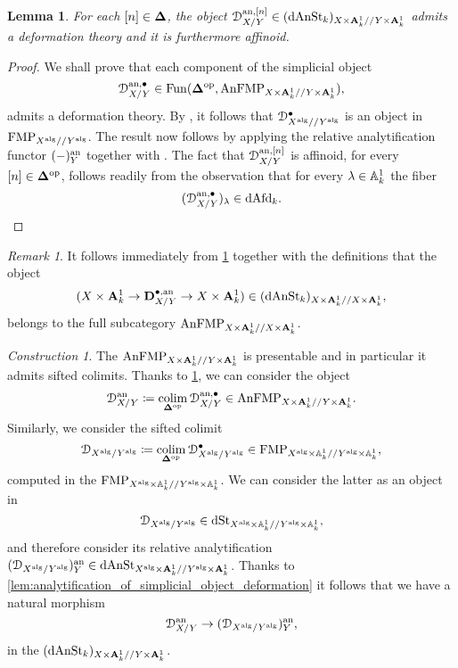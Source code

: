 \documentclass[10pt,a4paper,reqno]{amsart} %
\theoremstyle{plain}
\newtheorem{lem}[thm]{Lemma}
\theoremstyle{definition}
\theoremstyle{remark}
\newtheorem{rem}[thm]{Remark}
\numberwithin{equation}{section}
\newtheorem{construction}[thm]{Construction}
\begin{document}
\begin{lem} \label{lem:deformation_theory_for_D^an_bullet_X/Y}
    For each $[n] \in \bm{\Delta}$, the object $\mathcal D_{X/Y}^{\mathrm{an}, [n]} \in (\mathrm{dAnSt}_k)_{X \times \mathbf A^1_k/ /Y \times \mathbf A^1_k}$ admits a deformation theory and it is furthermore affinoid.
\end{lem}

\begin{proof}
    We shall prove that each component of the simplicial object
        \[\mathcal D^{ \mathrm{an}, \bullet}_{X/ Y} \in \operatorname{Fun}(\bm{\Delta} ^\mathrm{op}, \mathrm{AnFMP}_{X \times \mathbf A^1_k/ /Y\times\mathbf A^1_k}),\]
    admits a deformation theory.
    By \cite[Lemma 2.3.2]{Gaitsgory_Study_II}, it follows
    that $\mathcal D^\bullet_{X^\mathrm{alg}/ /Y^\mathrm{alg}}$ is an object in $\mathrm{FMP}_{X^\mathrm{alg}/ /Y^\mathrm{alg}}$. The result now follows by applying the relative analytification functor $(-)_Y^\mathrm{an}$ together with
    \cite[Proposition 6.10]{Porta_Yu_NQK}. The fact that
    $\mathcal D^{\mathrm{an}, [n]}_{X/Y}$ is affinoid, for every $[n] \in \bm{\Delta} ^\mathrm{op}$, follows readily from the observation that for every $\lambda \in \mathbb A^1_k$ the fiber
        \[
            (\mathcal D^{\mathrm{an}, \bullet}_{X/ Y})_\lambda \in \mathrm{dAfd}_k.  
        \]
\end{proof}

\begin{rem} \label{rem:D_X/Y_lives_over_and_under_XxA^1_as_anFMP}
    It follows immediately from \cref{lem:deformation_theory_for_D^an_bullet_X/Y} together with the definitions that the object
        \[
            (X \times \mathbf A^1_k \to \mathbf D^{\bullet, \mathrm{an}}_{X/ Y} \to X \times \mathbf A^1_k) \in (\mathrm{dAnSt}_k)_{X \times \mathbf A^1_k/ /X\times\mathbf A^1_k},  
        \]
    belongs to the full subcategory $\mathrm{AnFMP}_{X\times\mathbf A^1_k/ /X\times\mathbf A^1_k}$.
\end{rem}

\begin{construction}
    The \infcat $\mathrm{AnFMP}_{X\times\mathbf A^1_k/ /Y\times\mathbf A^1_k}$ is presentable and in particular it
    admits sifted colimits. Thanks to \cref{lem:deformation_theory_for_D^an_bullet_X/Y},
    we can consider the object
        \[
            \mathcal D^\mathrm{an}_{X/Y} \coloneqq \operatorname*{colim}_{\bm{\Delta} ^\mathrm{op}} \mathcal D^{\mathrm{an}, \bullet}_{X/Y} \in \mathrm{AnFMP}_{X\times\mathbf A^1_k/ /Y\times\mathbf A^1_k}.  
        \]
    Similarly, we consider the sifted colimit
        \[
            \mathcal D_{X^\mathrm{alg}/ Y^\mathrm{alg}} \coloneqq \operatorname*{colim}_{\bm{\Delta} ^\mathrm{op}} \mathcal D^\bullet_{X^\mathrm{alg}/ Y^\mathrm{alg}} \in \mathrm{FMP}_{X^\mathrm{alg} \times \mathbb A^1_k/ /Y^\mathrm{alg} \times \mathbb A^1_k} ,
        \]
    computed in the \infcat $\mathrm{FMP}_{X^\mathrm{alg}\times\mathbb A^1_k/ /Y^\mathrm{alg}\times\mathbb A^1_k}$. We can consider the latter as an object in
        \[
            \mathcal D_{X^\mathrm{alg}/ Y^\mathrm{alg}} \in \mathrm{dSt}_{X^\mathrm{alg} \times \mathbb A^1_k/ /Y^\mathrm{alg} \times \mathbb A^1_k},  
        \]
    and therefore consider its relative analytification $(\mathcal D_{X^\mathrm{alg}/ Y^\mathrm{alg}})^\mathrm{an}_Y \in \mathrm{dAnSt}_{X^\mathrm{alg} \times \mathbf A^1_k/ /Y^\mathrm{alg} \times \mathbf A^1_k}$. Thanks to
    \cref{lem:analytification_of_simplicial_object_deformation} it follows that we have a natural morphism
        \[
            \mathcal D^\mathrm{an}_{X/ Y} \to (\mathcal D_{X^\mathrm{alg}/ Y^\mathrm{alg}})^\mathrm{an}_Y,  
        \]
    in the \infcat $(\mathrm{dAnSt}_k)_{X \times \mathbf A^1_k/ /Y \times \mathbf A^1_k}$.
\end{construction}
\end{document}
